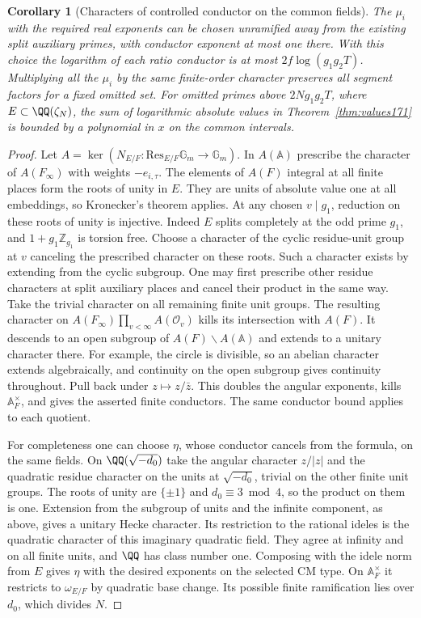\documentclass[a4paper,11pt]{article}
\newtheorem{corollary}[proposition]{Corollary}
\theoremstyle{definition}
\theoremstyle{remark}
\newcommand{\ZZ}{\mathbb Z}\newcommand{\ord}{\operatorname{ord}}
\numberwithin{equation}{section}
\newcommand{\OO}{\mathcal O}
\begin{document}
\begin{corollary}[Characters of controlled conductor on the common fields]
\label{cor:chars171}
The \(\mu_i\) with the required real exponents can be chosen
unramified away from the existing split auxiliary primes,
with conductor exponent at most one there. With this choice
the logarithm of each ratio conductor is at most
\(2f\log(g_1g_2T)\). Multiplying all the \(\mu_i\) by the
same finite-order character preserves all segment factors
for a fixed omitted set. For omitted primes above
\(2Ng_1g_2T\), where \(E\subset\QQ(\zeta_N)\), the sum
of logarithmic absolute values in Theorem~\ref{thm:values171}
is bounded by a polynomial in \(x\) on the common intervals.
\end{corollary}
\begin{proof}
Let \(A=\ker(N_{E/F}:\mathrm{Res}_{E/F}\mathbb G_m
\to\mathbb G_m)\). In \(A(\mathbb A)\) prescribe the character
of \(A(F_\infty)\) with weights \(-e_{i,\tau}\).
The elements of \(A(F)\) integral at all finite places form
the roots of unity in \(E\). They are units of absolute value
one at all embeddings, so Kronecker's theorem applies.
At any chosen \(v\mid g_1\), reduction on these roots of
unity is injective. Indeed \(E\) splits completely at the
odd prime \(g_1\), and \(1+g_1\ZZ_{g_1}\) is torsion free.
Choose a character of the cyclic residue-unit group at \(v\)
canceling the prescribed character on these roots. Such a
character exists by extending from the cyclic subgroup.
One may first prescribe other residue characters at split
auxiliary places and cancel their product in the same way.
Take the trivial character on all remaining finite unit
groups. The resulting character on
\(A(F_\infty)\prod_{v<\infty}A(\OO_v)\) kills its intersection
with \(A(F)\). It descends to an open subgroup of
\(A(F)\backslash A(\mathbb A)\) and extends to a unitary
character there. For example, the circle is divisible, so
an abelian character extends algebraically, and continuity
on the open subgroup gives continuity throughout. Pull back
under \(z\mapsto z/\bar z\). This doubles the angular
exponents, kills \(\mathbb A_F^\times\), and gives the
asserted finite conductors. The same conductor bound applies
to each quotient.

For completeness one can choose \(\eta\), whose conductor
cancels from the formula, on the same fields. On
\(\QQ(\sqrt{-d_0})\) take the angular character \(z/|z|\)
and the quadratic residue character on the units at
\(\sqrt{-d_0}\), trivial on the other finite unit groups.
The roots of unity are \(\{\pm1\}\) and \(d_0\equiv3\bmod4\),
so the product on them is one. Extension from the subgroup
of units and the infinite component, as above, gives a
unitary Hecke character. Its restriction to the rational
ideles is the quadratic character of this imaginary quadratic
field. They agree at infinity and on all finite units, and
\(\QQ\) has class number one. Composing with the idele norm
from \(E\) gives \(\eta\) with the desired exponents on the
selected CM type. On \(\mathbb A_F^\times\) it restricts to
\(\omega_{E/F}\) by quadratic base change. Its possible finite
ramification lies over \(d_0\), which divides \(N\).


\end{proof}
\end{document}
